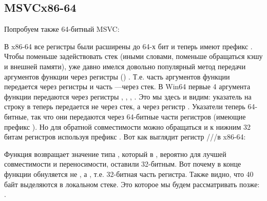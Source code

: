 \subsection{MSVC\EMDASH{}x86-64}

Попробуем также 64-битный MSVC:




В x86-64 все регистры были расширены до 64-х бит и теперь имеют префикс .
Чтобы поменьше задействовать стек (иными словами, поменьше обращаться кэшу и внешней памяти), уже давно имелся
довольно популярный метод передачи аргументов функции через регистры () .
Т.е. часть аргументов функции передается через регистры и часть ---через стек.
В Win64 первые 4 аргумента функции передаются через регистры \RCX, \RDX, , .
Это мы здесь и видим: указатель на строку в \printf теперь передается не через стек, а через регистр \RCX.
Указатели теперь 64-битные, так что они передаются через 64-битные части регистров (имеющие префикс ).
Но для обратной совместимости можно обращаться и к нижним 32 битам регистров используя префикс .
Вот как выглядит регистр \RAX/\EAX/\AX/\AL в x86-64:


Функция \main возвращает значение типа \Tint, который в \CCpp, вероятно для лучшей совместимости и переносимости,
оставили 32-битным. Вот почему в конце функции \main обнуляется не \RAX, а \EAX, т.е. 32-битная часть регистра.
Также видно, что 40 байт выделяются в локальном стеке.
Это  которое мы будем рассматривать позже: .
